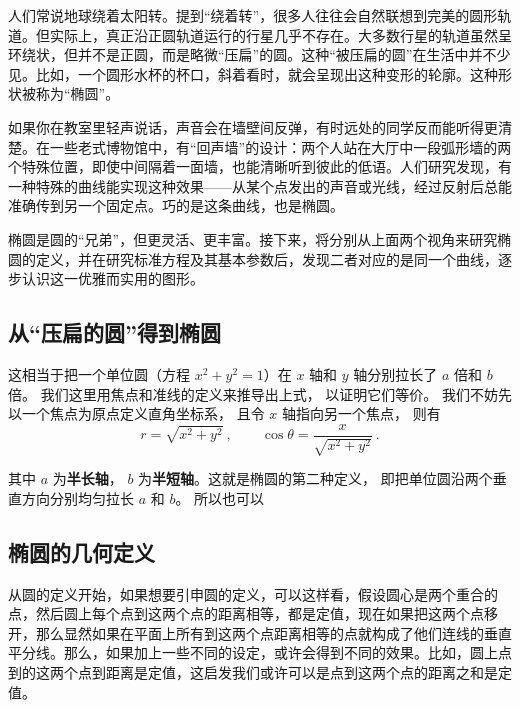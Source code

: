 
\begin{issues}
\issueDraft
\end{issues}



人们常说地球绕着太阳转。提到“绕着转”，很多人往往会自然联想到完美的圆形轨道。但实际上，真正沿正圆轨道运行的行星几乎不存在。大多数行星的轨道虽然呈环绕状，但并不是正圆，而是略微“压扁”的圆。这种“被压扁的圆”在生活中并不少见。比如，一个圆形水杯的杯口，斜着看时，就会呈现出这种变形的轮廓。这种形状被称为“椭圆”。

如果你在教室里轻声说话，声音会在墙壁间反弹，有时远处的同学反而能听得更清楚。在一些老式博物馆中，有“回声墙”的设计：两个人站在大厅中一段弧形墙的两个特殊位置，即使中间隔着一面墙，也能清晰听到彼此的低语。人们研究发现，有一种特殊的曲线能实现这种效果——从某个点发出的声音或光线，经过反射后总能准确传到另一个固定点。巧的是这条曲线，也是椭圆。

椭圆是圆的“兄弟”，但更灵活、更丰富。接下来，将分别从上面两个视角来研究椭圆的定义，并在研究标准方程及其基本参数后，发现二者对应的是同一个曲线，逐步认识这一优雅而实用的图形。

\subsection{从“压扁的圆”得到椭圆}

这相当于把一个单位圆（方程 $x^2 + y^2 = 1$）在 $x$ 轴和 $y$ 轴分别拉长了 $a$ 倍和 $b$ 倍。 我们这里用焦点和准线的定义来推导出上式， 以证明它们等价。 我们不妨先以一个焦点为原点定义直角坐标系， 且令 $x$ 轴指向另一个焦点， 则有
\begin{equation}
r = \sqrt{x^2 + y^2}~, \qquad \cos\theta = \frac{x}{\sqrt{x^2 + y^2}}~.
\end{equation}

其中 $a$ 为\textbf{半长轴}， $b$ 为\textbf{半短轴}。这就是椭圆的第二种定义， 即把单位圆沿两个垂直方向分别均匀拉长 $a$ 和 $b$。 所以也可以

\subsection{椭圆的几何定义}

从圆的定义开始，如果想要引申圆的定义，可以这样看，假设圆心是两个重合的点，然后圆上每个点到这两个点的距离相等，都是定值，现在如果把这两个点移开，那么显然如果在平面上所有到这两个点距离相等的点就构成了他们连线的垂直平分线。那么，如果加上一些不同的设定，或许会得到不同的效果。比如，圆上点到的这两个点到距离是定值，这启发我们或许可以是点到这两个点的距离之和是定值。

